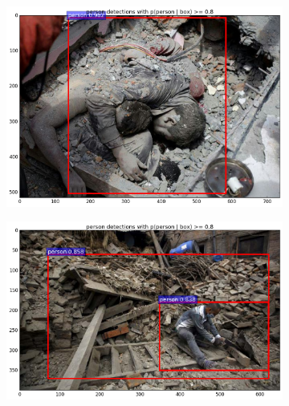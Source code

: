 \begin{figure}[ht]
  \centering
  \begin{subfigure}[b]{0.3\textwidth}
    \includegraphics[width=\textwidth]{idv1}
  \end{subfigure}             
  \begin{subfigure}[b]{0.3\textwidth}
    \includegraphics[width=\textwidth]{idv2}
  \end{subfigure}
  \begin{subfigure}[b]{0.3\textwidth}

\end{subfigure}
\end{figure}
